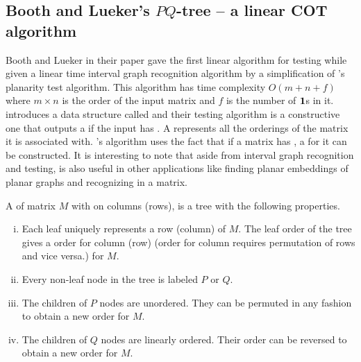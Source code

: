\subsection{Booth and Lueker's $PQ$-tree -- a linear COT algorithm} %


Booth and Lueker in their paper \cite{bl76} gave the first linear
algorithm for \cop testing while given a linear time interval graph
recognition algorithm by a simplification of \cite{lec67}'s planarity
test algorithm. This \COT algorithm has time complexity
$O\left(m+n+f\right)$ where $m \times n$ is the order of the input
matrix and $f$ is the number of $\textbf{1}$s in it.
%
\cite{bl76} introduces a data structure called \PQtree and their \COP
testing algorithm is a constructive one that outputs a \PQtree if the
input has \COP. A \PQtree represents all the \COP orderings of the
matrix it is associated with. \cite{bl76}'s algorithm uses the fact
that if a matrix has \COP, a \PQtree for it can be constructed. It is
interesting to note that aside from interval graph recognition and
\COP testing, \PQtree is also useful in other applications like
finding planar embeddings of planar graphs \cite{lec67,mcc04} and
recognizing \CROP in a matrix.

\begin{definition} 
  A \PQtree of matrix $M$ with \COP on columns (rows), is a tree with
  the following properties.
  \begin{enumerate}[i.]
    \singlespacing
  \item Each leaf uniquely represents a row (column) of $M$. The leaf
    order of the tree gives a \COP order for column (row) (\COP order
    for column requires permutation of rows and vice versa.) for $M$.
  \item Every non-leaf node in the tree is labeled $P$ or $Q$.
  \item \label{def::nodep} The children of $P$ nodes are
    unordered. They can be permuted in any fashion to obtain a new
    \COP order for $M$.
  \item \label{def::nodeq} The children of $Q$ nodes are linearly
    ordered. Their order can be reversed to obtain a new \COP
    order for $M$.
  \end{enumerate}
  \label{def:pqtree}
\end{definition}

